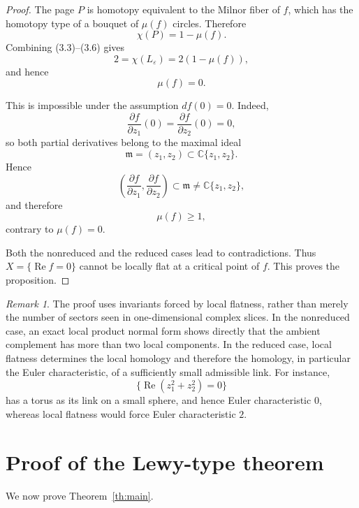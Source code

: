 \documentclass[11pt]{amsart}
\theoremstyle{definition}
\theoremstyle{remark}
\newtheorem{remark}[theorem]{Remark}
\newcommand{\re}{\operatorname{Re}}
\begin{document}
\begin{proof}
The page \(P\) is homotopy equivalent to the Milnor fiber of \(f\),
which has the homotopy type of a bouquet of \(\mu(f)\) circles.
Therefore
\[
        \chi(P)=1-\mu(f).
        \tag{3.6}
\]
Combining (3.3)--(3.6) gives
\[
        2
        =
        \chi(L_\varepsilon)
        =
        2(1-\mu(f)),
\]
and hence
\[
        \mu(f)=0.
\]

This is impossible under the assumption \(df(0)=0\). Indeed,
\[
        \frac{\partial f}{\partial z_1}(0)
        =
        \frac{\partial f}{\partial z_2}(0)
        =0,
\]
so both partial derivatives belong to the maximal ideal
\[
        \mathfrak m=(z_1,z_2)
        \subset\mathbb C\{z_1,z_2\}.
\]
Hence
\[
        \left(
        \frac{\partial f}{\partial z_1},
        \frac{\partial f}{\partial z_2}
        \right)
        \subset\mathfrak m
        \ne\mathbb C\{z_1,z_2\},
\]
and therefore
\[
        \mu(f)\ge1,
\]
contrary to \(\mu(f)=0\).

Both the nonreduced and the reduced cases lead to contradictions.
Thus \(X=\{\operatorname{Re}f=0\}\) cannot be locally flat at a
critical point of \(f\). This proves the proposition.
\end{proof}



\begin{remark}\label{rem:why-link-not-components}
The proof uses invariants forced by local flatness, rather than merely
the number of sectors seen in one-dimensional complex slices. In the
nonreduced case, an exact local product normal form shows directly that
the ambient complement has more than two local components. In the
reduced case, local flatness determines the local homology and therefore
the homology, in particular the Euler characteristic, of a sufficiently
small admissible link. For instance,
\[
        \{\re(z_1^2+z_2^2)=0\}
\]
has a torus as its link on a small sphere, and hence Euler
characteristic \(0\), whereas local flatness would force Euler
characteristic \(2\).
\end{remark}


\section{Proof of the Lewy-type theorem}

We now prove Theorem~\ref{th:main}.
\end{document}
